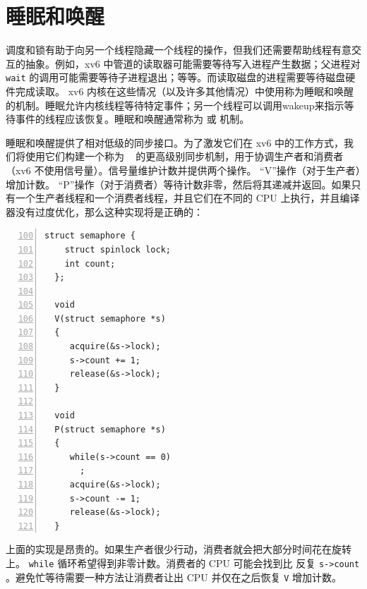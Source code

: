     \section{睡眠和唤醒  }   
    \label{sec:sleep}     

调度和锁有助于向另一个线程隐藏一个线程的操作，但我们还需要帮助线程有意交互的抽象。例如，xv6 中管道的读取器可能需要等待写入进程产生数据；父进程对    \lstinline{wait}    的调用可能需要等待子进程退出；等等。而读取磁盘的进程需要等待磁盘硬件完成读取。 xv6 内核在这些情况（以及许多其他情况）中使用称为睡眠和唤醒的机制。睡眠允许内核线程等待特定事件；另一个线程可以调用wakeup来指示等待事件的线程应该恢复。睡眠和唤醒通常称为
        或
        机制。  

睡眠和唤醒提供了相对低级的同步接口。为了激发它们在 xv6 中的工作方式，我们将使用它们构建一个称为        ~    \cite{dijkstra65}    的更高级别同步机制，用于协调生产者和消费者（xv6 不使用信号量）。信号量维护计数并提供两个操作。 “V”操作（对于生产者）增加计数。 “P”操作（对于消费者）等待计数非零，然后将其递减并返回。如果只有一个生产者线程和一个消费者线程，并且它们在不同的 CPU 上执行，并且编译器没有过度优化，那么这种实现将是正确的：
    \begin{lstlisting}[numbers=left,firstnumber=100]
  struct semaphore {
    struct spinlock lock;
    int count;
  };

  void
  V(struct semaphore *s)
  {
     acquire(&s->lock);
     s->count += 1;
     release(&s->lock);
  }

  void
  P(struct semaphore *s)
  {
     while(s->count == 0)
       ;
     acquire(&s->lock);
     s->count -= 1;
     release(&s->lock);
  }
\end{lstlisting}     

上面的实现是昂贵的。如果生产者很少行动，消费者就会把大部分时间花在旋转上。
    \lstinline{while}    循环希望得到非零计数。消费者的 CPU 可能会找到比
        反复
    \lstinline{s->count}    。避免忙等待需要一种方法让消费者让出 CPU 并仅在之后恢复
    \lstinline{V}    增加计数。  

